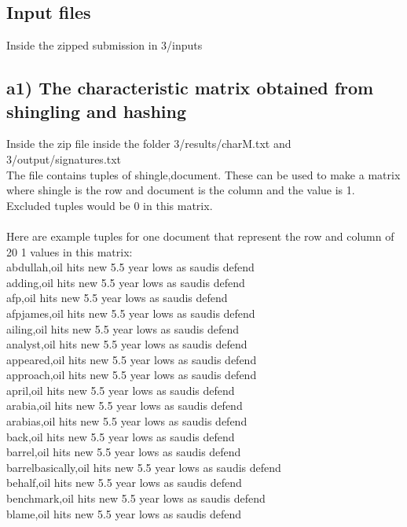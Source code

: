 \subsection*{Input files}
Inside the zipped submission in 3/inputs


\subsection*{a1) The characteristic matrix obtained from shingling and hashing}
Inside the zip file inside the folder 3/results/charM.txt and 3/output/signatures.txt
\\
The file contains tuples of shingle,document. These can be used to make a matrix where shingle is the row and document is the column and the value is 1. Excluded tuples would be 0 in this matrix. 
\\
\\
Here are example tuples for one document that represent the row and column of 20 1 values in this matrix:
\\
abdullah,oil hits new 5.5 year lows as saudis defend\\
adding,oil hits new 5.5 year lows as saudis defend \\
afp,oil hits new 5.5 year lows as saudis defend \\
afpjames,oil hits new 5.5 year lows as saudis defend\\ 
ailing,oil hits new 5.5 year lows as saudis defend \\
analyst,oil hits new 5.5 year lows as saudis defend \\
appeared,oil hits new 5.5 year lows as saudis defend \\
approach,oil hits new 5.5 year lows as saudis defend \\
april,oil hits new 5.5 year lows as saudis defend \\
arabia,oil hits new 5.5 year lows as saudis defend \\
arabias,oil hits new 5.5 year lows as saudis defend \\
back,oil hits new 5.5 year lows as saudis defend \\
barrel,oil hits new 5.5 year lows as saudis defend \\
barrelbasically,oil hits new 5.5 year lows as saudis defend\\ 
behalf,oil hits new 5.5 year lows as saudis defend \\
benchmark,oil hits new 5.5 year lows as saudis defend\\ 
blame,oil hits new 5.5 year lows as saudis defend \\
